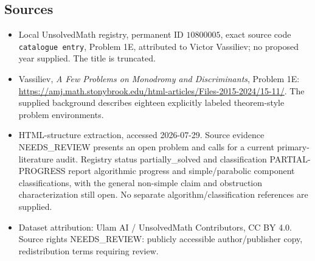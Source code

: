 \documentclass[11pt]{article}
\begin{document}
\subsection{Sources}
\begin{itemize}
\item Local UnsolvedMath registry, permanent ID \(10800005\), exact source code \texttt{catalogue entry}, Problem 1E, attributed to Victor Vassiliev; no proposed year supplied. The title is truncated.
\item Vassiliev, \emph{A Few Problems on Monodromy and Discriminants}, Problem 1E: \url{https://amj.math.stonybrook.edu/html-articles/Files-2015-2024/15-11/}. The supplied background describes eighteen explicitly labeled theorem-style problem environments.
\item HTML-structure extraction, accessed 2026-07-29. Source evidence NEEDS\_REVIEW presents an open problem and calls for a current primary-literature audit. Registry status partially\_solved and classification PARTIAL-PROGRESS report algorithmic progress and simple/parabolic component classifications, with the general non-simple claim and obstruction characterization still open. No separate algorithm/classification references are supplied.
\item Dataset attribution: Ulam AI / UnsolvedMath Contributors, CC BY 4.0. Source rights NEEDS\_REVIEW: publicly accessible author/publisher copy, redistribution terms requiring review.
\end{itemize}
\end{document}
